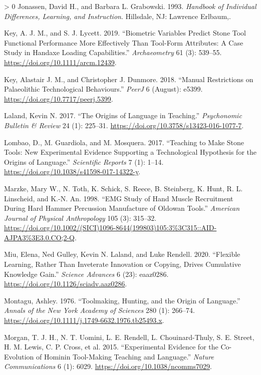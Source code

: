 \documentclass[smallextended]{svjour3}       %
\newlength{\cslhangindent}
\newenvironment{CSLReferences}[3] %
 {%
  \setlength{\parindent}{0pt}
  \ifodd #1 \everypar{\setlength{\hangindent}{\cslhangindent}}\ignorespaces\fi
  \ifnum #2 > 0
  \setlength{\parskip}{#3\baselineskip}
  \fi
 }%
 {}
\begin{document}
\begin{CSLReferences}{1}{0}
\leavevmode\hypertarget{ref-jonassen1993}{}%
Jonassen, David H., and Barbara L. Grabowski. 1993. \emph{Handbook of
Individual Differences, Learning, and Instruction}. Hillsdale, NJ:
Lawrence Erlbaum,.

\leavevmode\hypertarget{ref-key2019}{}%
Key, A. J. M., and S. J. Lycett. 2019. {``Biometric Variables Predict
Stone Tool Functional Performance More Effectively Than Tool-Form
Attributes: A Case Study in Handaxe Loading Capabilities.''}
\emph{Archaeometry} 61 (3): 539--55.
\url{https://doi.org/10.1111/arcm.12439}.

\leavevmode\hypertarget{ref-key2018}{}%
Key, Alastair J. M., and Christopher J. Dunmore. 2018. {``Manual
Restrictions on Palaeolithic Technological Behaviours.''} \emph{PeerJ} 6
(August): e5399. \url{https://doi.org/10.7717/peerj.5399}.

\leavevmode\hypertarget{ref-laland2017}{}%
Laland, Kevin N. 2017. {``The Origins of Language in Teaching.''}
\emph{Psychonomic Bulletin \& Review} 24 (1): 225--31.
\url{https://doi.org/10.3758/s13423-016-1077-7}.

\leavevmode\hypertarget{ref-lombao2017}{}%
Lombao, D., M. Guardiola, and M. Mosquera. 2017. {``Teaching to Make
Stone Tools: New Experimental Evidence Supporting a Technological
Hypothesis for the Origins of Language.''} \emph{Scientific Reports} 7
(1): 1--14. \url{https://doi.org/10.1038/s41598-017-14322-y}.

\leavevmode\hypertarget{ref-marzke1998}{}%
Marzke, Mary W., N. Toth, K. Schick, S. Reece, B. Steinberg, K. Hunt, R.
L. Linscheid, and K.-N. An. 1998. {``EMG Study of Hand Muscle
Recruitment During Hard Hammer Percussion Manufacture of Oldowan
Tools.''} \emph{American Journal of Physical Anthropology} 105 (3):
315--32.
\url{https://doi.org/10.1002/(SICI)1096-8644(199803)105:3\%3C315::AID-AJPA3\%3E3.0.CO;2-Q}.

\leavevmode\hypertarget{ref-miu2020}{}%
Miu, Elena, Ned Gulley, Kevin N. Laland, and Luke Rendell. 2020.
{``Flexible Learning, Rather Than Inveterate Innovation or Copying,
Drives Cumulative Knowledge Gain.''} \emph{Science Advances} 6 (23):
eaaz0286. \url{https://doi.org/10.1126/sciadv.aaz0286}.

\leavevmode\hypertarget{ref-montagu1976}{}%
Montagu, Ashley. 1976. {``Toolmaking, Hunting, and the Origin of
Language.''} \emph{Annals of the New York Academy of Sciences} 280 (1):
266--74. \url{https://doi.org/10.1111/j.1749-6632.1976.tb25493.x}.

\leavevmode\hypertarget{ref-morgan2015}{}%
Morgan, T. J. H., N. T. Uomini, L. E. Rendell, L. Chouinard-Thuly, S. E.
Street, H. M. Lewis, C. P. Cross, et al. 2015. {``Experimental Evidence
for the Co-Evolution of Hominin Tool-Making Teaching and Language.''}
\emph{Nature Communications} 6 (1): 6029.
\url{https://doi.org/10.1038/ncomms7029}.


\end{CSLReferences}
\end{document}
